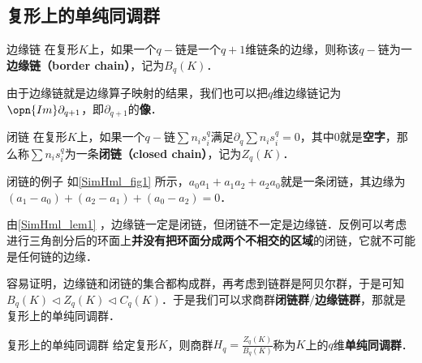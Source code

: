 \subsection{复形上的单纯同调群}


\begin{definition}{边缘链}
在复形$K$上，如果一个$q-$链是一个$q+1$维链条的边缘，则称该$q-$链为一\textbf{边缘链（border chain）}，记为$B_q(K)$．
\end{definition}

由于边缘链就是边缘算子映射的结果，我们也可以把$q$维边缘链记为$\opn{Im}\partial_{q+1}$，即$\partial_{q+1}$的\textbf{像}．

\begin{definition}{闭链}
在复形$K$上，如果一个$q-$链$\sum n_is^q_i$满足$\partial_q\sum n_is^q_i=0$，其中$0$就是\textbf{空字}，那么称$\sum n_is^q_i$为一条\textbf{闭链（closed chain）}，记为$Z_q(K)$．
\end{definition}

\begin{example}{闭链的例子}
如\autoref{SimHml_fig1} 所示，$a_0a_1+a_1a_2+a_2a_0$就是一条闭链，其边缘为$(a_1-a_0)+(a_2-a_1)+(a_0-a_2)=0$．
\end{example}

由\autoref{SimHml_lem1} ，边缘链一定是闭链，但闭链不一定是边缘链．反例可以考虑进行三角剖分后的环面上\textbf{并没有把环面分成两个不相交的区域}的闭链，它就不可能是任何链的边缘．

容易证明，边缘链和闭链的集合都构成群，再考虑到链群是阿贝尔群，于是可知$B_q(K)\triangleleft Z_q(K)\triangleleft C_q(K)$．于是我们可以求商群\textbf{闭链群}$/$\textbf{边缘链群}，那就是复形上的单纯同调群．


\begin{definition}{复形上的单纯同调群}
给定复形$K$，则商群$H_q=\frac{Z_q(K)}{B_q(K)}$称为$K$上的$q$维\textbf{单纯同调群}．
\end{definition}




